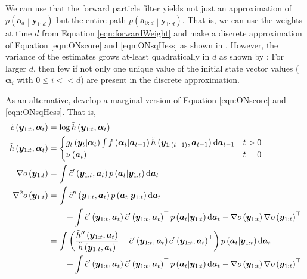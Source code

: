 \documentclass[notitlepage]{article}
\renewcommand{\vec}[1]{\bm{#1}}
\newcommand{\Lparen}[1]{\left( #1\right)}
\newcommand{\Cond}[2]{ #1 \middle\vert  #2}
\newcommand*\diff{\mathop{}\!\mathrm{d}}
\newcommand{\optor}[2]{#1\Lparen{#2}}
\newcommand{\optorC}[3]{\optor{#1}{\Cond{#2}{#3}}}
\begin{document}
We can use that the forward particle filter yields not just an approximation of 
$\optorC{p}{\vec a_{d}}{\vec y_{1:d}}$ but the entire path 
$\optorC{p}{\vec a_{0:d}}{\vec y_{1:d}}$. That is, we can use the weights at time 
$d$ from Equation \eqref{eqn:forwardWeight} and make a discrete approximation 
of Equation \eqref{eqn:ONscore} and \eqref{eqn:ONsqHess} as shown in \cite{cappe05}. 
However, the variance of the estimates grows at-least quadratically in $d$ as shown 
by \cite{poyiadjis11}; For larger $d$, then few if not only one unique value 
of the initial state vector values ($\vec\alpha_i$ with $0\leq i <\!\!< d$) 
are present in the discrete approximation.  

As an alternative, \cite{poyiadjis11} develop a marginal 
version of Equation \eqref{eqn:ONscore} and \eqref{eqn:ONsqHess}. 
That is,  %
%
\begin{align}
\tilde c\Lparen{\vec y_{1:t}, \vec\alpha_t} &= 
	\log\tilde h\Lparen{\vec y_{1:t}, \vec\alpha_t} \nonumber\\
%
\tilde h\Lparen{\vec y_{1:t}, \vec\alpha_t} &=
	\begin{cases} 
	\optorC{g_t}{\vec y_t}{\vec\alpha_t}	
	\int 
	\optorC{f}{\vec\alpha_t}{\vec a_{t - 1}}	
	\tilde h\Lparen{\vec y_{1:(t - 1)}, \vec a_{t- 1}}\diff\vec a_{t-1} & t > 0 \\
	\nu\Lparen{\vec a_{t}} & t = 0
	\end{cases}	
	\label{eqn:scoreNSqArg2} \\
%
\nabla o\Lparen{\vec y_{1:t}}
&= \int \tilde c'\Lparen{\vec y_{1:t}, \vec a_t}\optorC{p}{\vec a_t}{\vec y_{1:t}}
	\diff\vec a_t \label{eqn:scoreNsq}\\
%
\nabla^2 o\Lparen{\vec y_{1:t}}
&= \int \tilde c''\Lparen{\vec y_{1:t}, \vec a_t}\optorC{p}{\vec a_t}{\vec y_{1:t}}
	\diff\vec a_t \nonumber\\
&\hspace{20pt}+\int 
	\tilde c'\Lparen{\vec y_{1:t}, \vec a_t}
    \tilde c'\Lparen{\vec y_{1:t}, \vec a_t}^\top
	\optorC{p}{\vec a_t}{\vec y_{1:t}}\diff\vec a_t 
	- \nabla o\Lparen{\vec y_{1:t}}
	 \nabla o\Lparen{\vec y_{1:t}}^\top \nonumber\\
%
&= \int \Lparen{
	\frac{%
	\tilde h''\Lparen{\vec y_{1:t}, \vec a_t}}{
	\tilde h  \Lparen{\vec y_{1:t}, \vec a_t}}
	- \tilde c'\Lparen{\vec y_{1:t}, \vec a_t}
      \tilde c'\Lparen{\vec y_{1:t}, \vec a_t}^\top}
	\optorC{p}{\vec a_t}{\vec y_{1:t}}
	\diff\vec a_t \label{eqn:hessNsq}\\
&\hspace{20pt}+\int 
	\tilde c'\Lparen{\vec y_{1:t}, \vec a_t}
    \tilde c'\Lparen{\vec y_{1:t}, \vec a_t}^\top
	\optorC{p}{\vec a_t}{\vec y_{1:t}}\diff\vec a_t 
	- \nabla o\Lparen{\vec y_{1:t}}
	 \nabla o\Lparen{\vec y_{1:t}}^\top \nonumber
\end{align}
\end{document}
